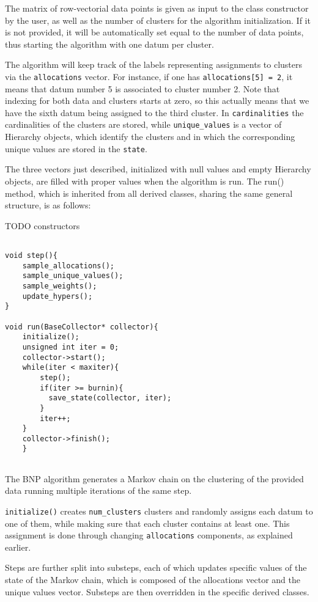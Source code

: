 The matrix of row-vectorial data points is given as input to the class constructor by the user, as well as the number of clusters for the algorithm initialization. If it is not provided, it will be automatically set equal to the number of data points, thus starting the algorithm with one datum per cluster.

The algorithm will keep track of the labels representing assignments to clusters via the \verb|allocations| vector.
For instance, if one has \verb|allocations[5] = 2|, it means that datum number 5 is associated to cluster number 2.
Note that indexing for both data and clusters starts at zero, so this actually means that we have the sixth datum being assigned to the third cluster. 
In \verb|cardinalities| the cardinalities of the clusters are stored, while \verb|unique_values| is a vector of Hierarchy objects, which identify the clusters and in which the corresponding unique values are stored in the \verb|state|.

The three vectors just described, initialized with null values and empty Hierarchy objects, are filled with proper values when the algorithm is run.
The run() method, which is inherited from all derived classes, sharing the same general structure, is as follows:

TODO constructors

\begin{verbatim}

void step(){
    sample_allocations();
    sample_unique_values();
    sample_weights();
    update_hypers();
}

void run(BaseCollector* collector){
    initialize();
    unsigned int iter = 0;
    collector->start();
    while(iter < maxiter){
        step();
        if(iter >= burnin){
          save_state(collector, iter);
        }
        iter++;
    }
    collector->finish();
    }
    
\end{verbatim}

The BNP algorithm generates a Markov chain on the clustering of the provided data running multiple iterations of the same step.

\verb|initialize()| creates \verb|num_clusters| clusters and randomly assigns each datum to one of them, while making sure that each cluster contains at least one.
	This assignment is done through changing \verb|allocations| components, as explained earlier.

Steps are further split into substeps, each of which updates specific values of the state of the Markov chain, which is composed of the allocations vector and the unique values vector. Substeps are then overridden in the specific derived classes.

